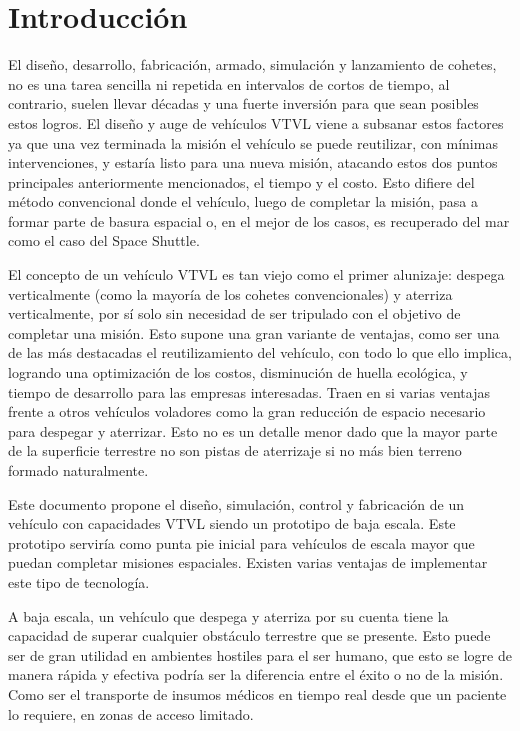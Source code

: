 
\section{Introducción}
El diseño, desarrollo, fabricación, armado, simulación y lanzamiento de cohetes, no es una tarea
sencilla ni repetida en intervalos de cortos de tiempo, al contrario, suelen llevar décadas y una
fuerte inversión para que sean posibles estos logros. El diseño y auge de vehículos VTVL viene
a subsanar estos factores ya que una vez terminada la misión el vehículo se puede reutilizar,
con mínimas intervenciones, y estaría listo para una nueva misión, atacando estos dos puntos principales anteriormente mencionados, el tiempo y el costo. Esto difiere del método convencional donde el vehículo, luego de completar la misión, pasa a formar parte de basura espacial o, en el mejor de los casos, es recuperado del mar como el caso del Space Shuttle. 

\medskip

El concepto de un vehículo VTVL es tan viejo como el primer alunizaje: despega verticalmente (como la mayoría de los cohetes
convencionales) y aterriza verticalmente, por sí solo sin necesidad de ser tripulado con el
objetivo de completar una misión. Esto supone una gran variante de ventajas, como ser una de
las más destacadas el reutilizamiento del vehículo, con todo lo que ello implica, logrando una
optimización de los costos, disminución de huella ecológica, y tiempo de desarrollo para las empresas interesadas. Traen en si varias ventajas frente a otros vehículos voladores como la gran reducción de espacio necesario para despegar y aterrizar. Esto no es un detalle menor dado que la mayor parte de la superficie terrestre no son pistas de aterrizaje si no más bien terreno formado naturalmente.

\medskip


\medskip

Este documento propone el diseño, simulación, control y fabricación de un vehículo con capacidades VTVL siendo un prototipo de baja escala. 
Este prototipo serviría como punta pie inicial
para vehículos de escala mayor que puedan completar misiones espaciales. Existen varias ventajas de implementar este tipo de tecnología.

\medskip

A baja escala, un vehículo que despega y aterriza por su cuenta tiene la capacidad de
superar cualquier obstáculo terrestre que se presente. Esto puede ser de gran utilidad en ambientes hostiles para el
ser humano, que esto se logre de manera rápida y efectiva podría ser la diferencia entre el
éxito o no de la misión.
Como ser el transporte de insumos médicos en tiempo real desde que un paciente lo requiere,
en zonas de acceso limitado.

